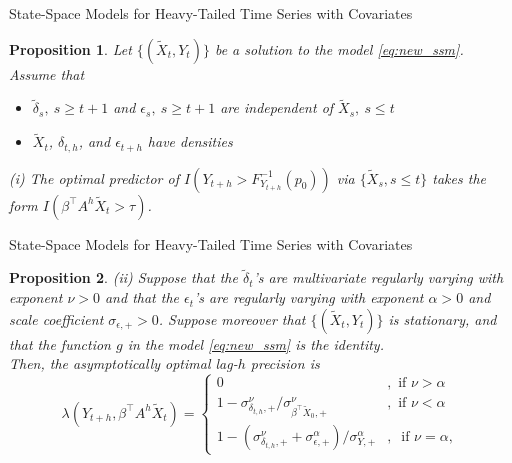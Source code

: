 \documentclass{beamer}
\newtheorem{proposition}{Proposition}
\begin{document}
\begin{frame}{State-Space Models for Heavy-Tailed Time Series with Covariates}
    \begin{proposition}
        Let $\{(\tilde X_t,Y_t)\}$ be a solution to the model \eqref{eq:new_ssm}. Assume that
        \begin{itemize}
            \item $\tilde{\delta}_s, \ s \ge t + 1$ and $\epsilon_s, \ s \ge t + 1$ are independent of $\tilde{X}_s, \ s \le t$
            \item $\tilde X_t$, $\delta_{t, h}$, and $\epsilon_{t+h}$ have densities
        \end{itemize}

        \medskip
        
        {\em (i)} The optimal predictor of $I(Y_{t+h}> F_{Y_{t+h}}^{-1}(p_0))$
        via $\{ \tilde X_s, s\le t\}$ takes the form $I(\beta^\top A^{h}\tilde X_t > \tau)$.
    \end{proposition}
\end{frame}

\begin{frame}{State-Space Models for Heavy-Tailed Time Series with Covariates}
    \begin{proposition}
        {\em (ii)} Suppose that the $\tilde{\delta}_t$'s are multivariate regularly varying with exponent $\nu>0$ and that the $\epsilon_t$'s are regularly varying with exponent
        $\alpha>0$ and scale coefficient $\sigma_{\epsilon,+}>0$.  Suppose moreover that $\{ (\tilde X_t, Y_t)\}$ is stationary, and
        that the function $g$ in the model \eqref{eq:new_ssm} is the identity. \\
        
        Then, the asymptotically optimal lag-$h$ precision is
        \begin{equation*}
        \lambda(Y_{t+h}, \beta^\top A^h \tilde X_t) = \left\{ \begin{array}{ll} 
        0 &, \mbox{ if } \nu>\alpha\\
        1- \sigma_{\delta_{t,h},+}^\nu / \sigma_{\beta^\top \tilde X_{0},+}^\nu &, \mbox{ if } \nu < \alpha\\
        1- (\sigma_{\delta_{t,h},+}^\nu + \sigma_{\epsilon,+}^\alpha) / \sigma_{Y,+}^\alpha &,\ \mbox{ if } \nu = \alpha,
        \end{array}\right.
        \end{equation*}
    \end{proposition}
\end{frame}    
\end{document}
